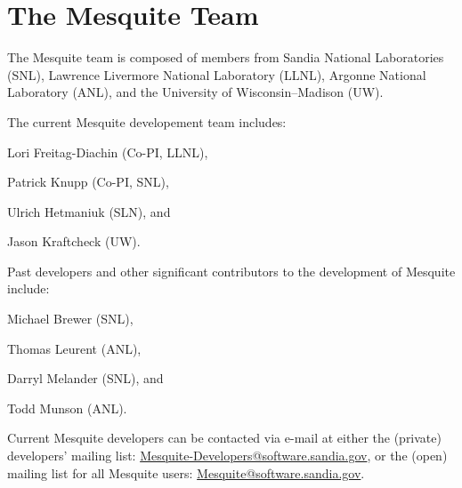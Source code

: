 \chapter{The Mesquite Team}

The Mesquite team is composed of members from Sandia
National Laboratories (SNL), Lawrence Livermore National Laboratory (LLNL),
 Argonne National Laboratory (ANL), and the University of Wisconsin--Madison (UW).\newline
 
\noindent The current Mesquite developement team includes: \newline

Lori Freitag-Diachin (Co-PI, LLNL), \newline

Patrick Knupp (Co-PI, SNL), \newline

Ulrich Hetmaniuk (SLN), and \newline

Jason Kraftcheck (UW).  \newline

\noindent Past developers and other significant contributors to
the development of Mesquite include:\newline

Michael Brewer (SNL), \newline

Thomas Leurent (ANL), \newline

Darryl Melander (SNL), and \newline

Todd Munson (ANL).  \newline

\noindent Current Mesquite developers can be contacted via e-mail at either 
the (private) developers' mailing list: 
\href{mailto:mesquite-developers@software.sandia.gov}
{Mesquite-Developers@software.sandia.gov},
or the (open) mailing list for all Mesquite users: 
\href{mailto:mesquite@software.sandia.gov}{Mesquite@software.sandia.gov}.

